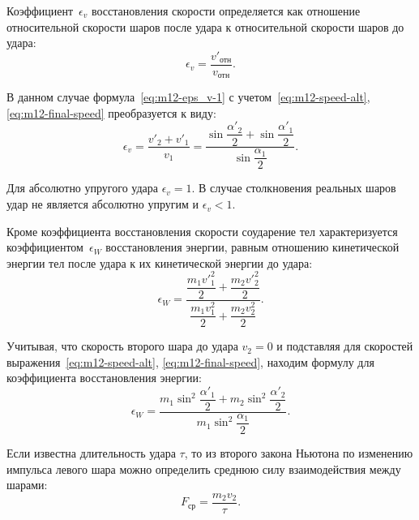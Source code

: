 \documentclass[a4paper, 12pt]{extarticle}
\newcommand{\eps}{\epsilon}
\begin{document}
Коэффициент~$\eps_v$ восстановления скорости определяется как отношение относительной скорости шаров после удара к относительной скорости шаров до удара:
\begin{equation}
\label{eq:m12-eps_v-1}
\eps_v = \frac{v'_\text{отн}}{v_\text{отн}}.
\end{equation}

В данном случае формула~\eqref{eq:m12-eps_v-1} с учетом~\eqref{eq:m12-speed-alt}, \eqref{eq:m12-final-speed} преобразуется к виду: 
\begin{equation}
\label{eq:m12-eps_v-2}
\eps_v = \frac{v'_2 + v'_1}{v_1} = \frac{\sin \dfrac{\alpha'_2}{2} + \sin \dfrac{\alpha'_1}{2}}{\sin \dfrac{\alpha_1}{2}}.
\end{equation}

Для абсолютно упругого удара $\eps_v = 1$. В случае столкновения реальных шаров удар не является абсолютно упругим и $\eps_v < 1$. 

Кроме коэффициента восстановления скорости соударение тел характеризуется коэффициентом~$\eps_W$ восстановления энергии, равным отношению кинетической энергии тел после удара к их кинетической энергии до удара:
\begin{equation}
\label{eq:m12-eps_W-1}
\eps_W = \frac{\dfrac{m_1 v'^2_1}{2} + \dfrac{m_2 v'^2_2}{2}}{\dfrac{m_1 v^2_1}{2} + \dfrac{m_2 v^2_2}{2}}.
\end{equation} %

Учитывая, что скорость второго шара до удара $v_2 = 0$ и подставляя для скоростей выражения~\eqref{eq:m12-speed-alt}, \eqref{eq:m12-final-speed}, находим формулу для коэффициента восстановления энергии:
\begin{equation}
\label{eq:m12-eps_W-2}
\eps_W = \frac{m_1 \sin^2 \dfrac{\alpha'_1}{2} + m_2 \sin^2 \dfrac{\alpha'_2}{2}}{m_1 \sin^2 \dfrac{\alpha_1}{2}}.
\end{equation}

Если известна длительность удара $\tau$, то из второго закона Ньютона по изменению импульса левого шара можно определить среднюю силу взаимодействия между шарами:
\begin{equation}
\label{eq:m12-2nd-newton's-law}
F_\text{ср} = \frac{m_2 v_2}{\tau}.
\end{equation}
\end{document}

